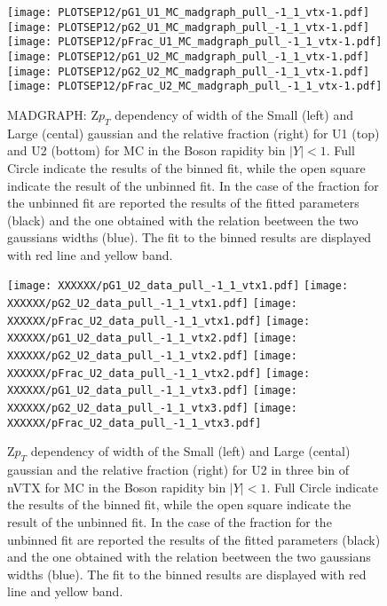 \documentclass[41pt,a4paper,oneside]{report}
\begin{document}
\begin{figure}[h!]
  \begin{center}
    \texttt{[image: PLOTSEP12/pG1\_U1\_MC\_madgraph\_pull\_-1\_1\_vtx-1.pdf]}
    \texttt{[image: PLOTSEP12/pG2\_U1\_MC\_madgraph\_pull\_-1\_1\_vtx-1.pdf]}
    \texttt{[image: PLOTSEP12/pFrac\_U1\_MC\_madgraph\_pull\_-1\_1\_vtx-1.pdf]} 
    \texttt{[image: PLOTSEP12/pG1\_U2\_MC\_madgraph\_pull\_-1\_1\_vtx-1.pdf]}
    \texttt{[image: PLOTSEP12/pG2\_U2\_MC\_madgraph\_pull\_-1\_1\_vtx-1.pdf]}
    \texttt{[image: PLOTSEP12/pFrac\_U2\_MC\_madgraph\_pull\_-1\_1\_vtx-1.pdf]} 
    \caption{MADGRAPH: Z$p_{T}$ dependency of width of the Small (left) and Large (cental) gaussian and the relative fraction (right) for U1 (top) and U2 (bottom) for MC in the Boson rapidity bin $|Y|<1$. Full Circle indicate the results of the binned fit, while the open square indicate the result of the unbinned fit. In the case of the fraction for the unbinned fit are reported the results of the fitted parameters (black) and the one obtained with the relation beetween the two gaussians widths (blue). The fit to the binned results are displayed with red line and yellow band.}
    \label{fig:SmallLargeMAD}
  \end{center}
  \begin{center}
    \texttt{[image: XXXXXX/pG1\_U2\_data\_pull\_-1\_1\_vtx1.pdf]}
    \texttt{[image: XXXXXX/pG2\_U2\_data\_pull\_-1\_1\_vtx1.pdf]}
    \texttt{[image: XXXXXX/pFrac\_U2\_data\_pull\_-1\_1\_vtx1.pdf]} 
    \texttt{[image: XXXXXX/pG1\_U2\_data\_pull\_-1\_1\_vtx2.pdf]}
    \texttt{[image: XXXXXX/pG2\_U2\_data\_pull\_-1\_1\_vtx2.pdf]}
    \texttt{[image: XXXXXX/pFrac\_U2\_data\_pull\_-1\_1\_vtx2.pdf]} 
    \texttt{[image: XXXXXX/pG1\_U2\_data\_pull\_-1\_1\_vtx3.pdf]}
    \texttt{[image: XXXXXX/pG2\_U2\_data\_pull\_-1\_1\_vtx3.pdf]}
    \texttt{[image: XXXXXX/pFrac\_U2\_data\_pull\_-1\_1\_vtx3.pdf]} 
    \caption{Z$p_{T}$ dependency of width of the Small (left) and Large (cental) gaussian and the relative fraction (right) for U2 in three bin of nVTX for MC in the Boson rapidity bin $|Y|<1$. Full Circle indicate the results of the binned fit, while the open square indicate the result of the unbinned fit. In the case of the fraction for the unbinned fit are reported the results of the fitted parameters (black) and the one obtained with the relation beetween the two gaussians widths (blue). The fit to the binned results are displayed with red line and yellow band.}
    \label{fig:SmallLargeDATAVTX}
  \end{center}
\end{figure}
\end{document}
